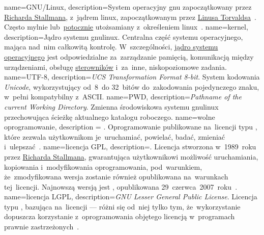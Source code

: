 {
	name={GNU/Linux},
	description={System operacyjny \gls{gnu} zapoczątkowany przez \href{https://en.wikipedia.org/wiki/Richard_Stallman}{Richarda Stallmana}, z~jądrem \gls{linux}, zapoczątkowanym przez \href{https://en.wikipedia.org/wiki/Linus_Torvalds}{Linusa Torvaldsa}~\cite{gnulinux}. Często mylnie lub~\href{https://en.wikipedia.org/wiki/GNU/Linux_naming_controversy}{potocznie} utożsamiany z~określeniem \gls{linux}~\cite{gnu-faq}.}
}
{
	name={kernel},
	description={Jądro systemu \gls{gnulinux}. Centralna część systemu operacyjnego, mająca nad~nim całkowitą kontrolę. W~szczególności, \href{https://en.wikipedia.org/wiki/Kernel_(operating_system)}{jądro systemu operacyjnego} jest odpowiedzialne za~zarządzanie pamięcią, komunikacją między urządzeniami, obsługę \href{https://lwn.net/Kernel/LDD3/}{sterowników} i~za~inne, niskopoziomowe zadania.}
}
{
	name={UTF-8},
	description={\emph{UCS Transformation Format 8-bit}. System kodowania \emph{Unicode}, wykorzystujący od~8~do 32~bitów do~zakodowania pojedynczego znaku, w~pełni kompatybilny z~\gls{ASCII}.}
}
{
	name={PWD},
	description={\emph{Pathname of the current Working Directory}. Zmienna środowiskowa systemu \gls{gnulinux} przechowująca ścieżkę aktualnego katalogu roboczego.}
}
{
	name={wolne oprogramowanie},
	description = {. Oprogramowanie publikowane na~licencji typu , które zezwala użytkownikom je~uruchamiać, powielać, badać, zmieniać i~ulepszać~\cite{free-software}.}
}
{
	name={licencja GPL},
	description={. Licencja  stworzona w~1989~roku przez \href{https://en.wikipedia.org/wiki/Richard_Stallman}{Richarda Stallmana}, gwarantująca użytkownikowi możliwość uruchamiania, kopiowania i~modyfikowania oprogramowania, pod~warunkiem, że~zmodyfikowana wersja zostanie również opublikowana na~warunkach tej~licencji. Najnowszą wersją  jest , opublikowana 29~czerwca~2007~roku~\cite{gpl3}.}
}
{
	name={licencja LGPL},
	description={\emph{GNU Lesser General Public License}. Licencja typu , bazująca na~licencji  --- różni się od~niej tylko tym, że~wykorzystanie  dopuszcza korzystanie z~oprogramowania objętego licencją w~programach prawnie zastrzeżonych~\cite{lgpl3,why-not-lgpl}.}
}
